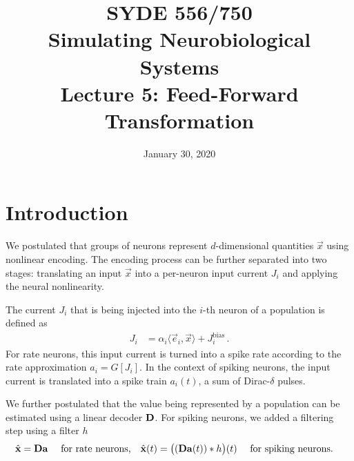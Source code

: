 \documentclass[10pt,letterpaper,oneside]{article}
\date{January 30, 2020}
\title{SYDE 556/750 \\ Simulating Neurobiological Systems \\ Lecture 5: Feed-Forward Transformation}
\begin{document}
	
	
	\section{Introduction}
	
	
	We postulated that groups of neurons represent $d$-dimensional quantities $\vec x$ using nonlinear encoding. The encoding process can be further separated into two stages: translating an input $\vec x$ into a per-neuron input current $J_i$ and applying the neural nonlinearity.
	
	The current $J_i$ that is being injected into the $i$-th neuron of a population is defined as
	\begin{align}
	J_i &= \alpha_i \langle \vec e_i, \vec x \rangle + J^\mathrm{bias}_i \,.
	\label{eqn:current}
	\end{align}
	For rate neurons, this input current is turned into a spike rate according to the rate approximation $a_i = G[J_i]$. In the context of spiking neurons, the input current is translated into a spike train $a_i(t)$, a sum of Dirac-$\delta$ pulses.
	
	We further postulated that the value being represented by a population can be estimated using a linear decoder ${\mathbf{D}}$. For spiking neurons, we added a filtering step using a filter $h$
	\begin{align}
	\hat{{\mathbf{x}}} &= {\mathbf{D}} {\mathbf{a}} \quad \text{ for rate neurons,} & 
	\hat{{\mathbf{x}}}(t) &= \big( ({\mathbf{D}} {\mathbf{a}}(t)) \ast h \big)(t) \quad \text{ for spiking neurons.}
	\label{eqn:decoding}
	\end{align}
	
\end{document}
